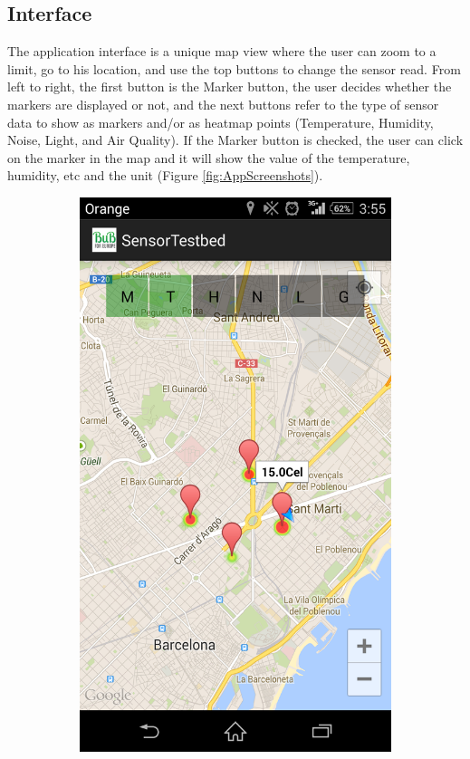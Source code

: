 \documentclass[12pt, a4paper,twoside]{tesi_upf}
\begin{document}
    \subsection{Interface}
      The application interface is a unique map view where the user can zoom to a limit, go to his location, and use the top buttons to change the sensor read. From left to right, the first button is the Marker button, the user decides whether the markers are displayed or not, and the next buttons refer to the type of sensor data to show as markers and/or as heatmap points (Temperature, Humidity, Noise, Light, and Air Quality).
      If the Marker button is checked, the user can click on the marker in the map and it will show the value of the temperature, humidity, etc and the unit (Figure \ref{fig:AppScreenshots}).
      \begin{figure}
        \centering
        \begin{subfigure}[b]{0.3\textwidth}
                \includegraphics[width=\textwidth]{./Figures/App_Screenshot_1.png}

\end{subfigure}
\end{figure}
\end{document}
